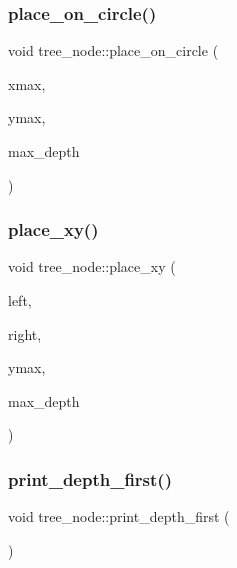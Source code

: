\subsubsection{\texorpdfstring{place\+\_\+on\+\_\+circle()}{place\_on\_circle()}}
{\footnotesize\ttfamily void tree\+\_\+node\+::place\+\_\+on\+\_\+circle (\begin{DoxyParamCaption}\item[{\mbox{\hyperlink{galois_8h_a09fddde158a3a20bd2dcadb609de11dc}{I\+NT}}}]{xmax,  }\item[{\mbox{\hyperlink{galois_8h_a09fddde158a3a20bd2dcadb609de11dc}{I\+NT}}}]{ymax,  }\item[{\mbox{\hyperlink{galois_8h_a09fddde158a3a20bd2dcadb609de11dc}{I\+NT}}}]{max\+\_\+depth }\end{DoxyParamCaption})}

\mbox{\label{classtree__node_a1229c03fa683790dcaed74831d9ceb81}} 
\subsubsection{\texorpdfstring{place\+\_\+xy()}{place\_xy()}}
{\footnotesize\ttfamily void tree\+\_\+node\+::place\+\_\+xy (\begin{DoxyParamCaption}\item[{\mbox{\hyperlink{galois_8h_a09fddde158a3a20bd2dcadb609de11dc}{I\+NT}}}]{left,  }\item[{\mbox{\hyperlink{galois_8h_a09fddde158a3a20bd2dcadb609de11dc}{I\+NT}}}]{right,  }\item[{\mbox{\hyperlink{galois_8h_a09fddde158a3a20bd2dcadb609de11dc}{I\+NT}}}]{ymax,  }\item[{\mbox{\hyperlink{galois_8h_a09fddde158a3a20bd2dcadb609de11dc}{I\+NT}}}]{max\+\_\+depth }\end{DoxyParamCaption})}

\mbox{\label{classtree__node_a19c74e6fb9f581b092140d9b1c6b544a}} 
\subsubsection{\texorpdfstring{print\+\_\+depth\+\_\+first()}{print\_depth\_first()}}
{\footnotesize\ttfamily void tree\+\_\+node\+::print\+\_\+depth\+\_\+first (\begin{DoxyParamCaption}{ }\end{DoxyParamCaption})}

